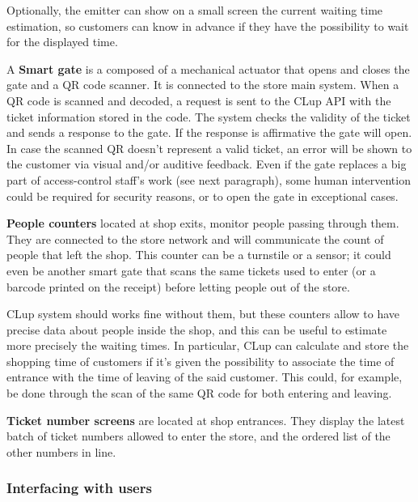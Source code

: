 Optionally, the emitter can show on a small screen the current waiting time estimation, so customers can know in advance if they have the possibility to wait for the displayed time.


A \textbf{Smart gate} is a composed of a mechanical actuator that opens and closes the gate and a QR code scanner. It is connected to the store main system. When a QR code is scanned and decoded, a request is sent to the CLup API with the ticket information stored in the code.
The system checks the validity of the ticket and sends a response to the gate. If the response is affirmative the gate will open. In case the scanned QR doesn't represent a valid ticket, an error will be shown to the customer via visual and/or auditive feedback. Even if the gate replaces a big part of access-control staff's work (see next paragraph), some human intervention could be required for security reasons, or to open the gate in exceptional cases.


\textbf{People counters} located at shop exits, monitor people passing through them. They are connected to the store network and will communicate the count of people that left the shop. This counter can be a turnstile or a sensor; it could even be another smart gate that scans the same tickets used to enter (or a barcode printed on the receipt) before letting people out of the store.

CLup system should works fine without them, but these counters allow to have precise data about people inside the shop, and this can be useful to estimate more precisely the waiting times. In particular, CLup can calculate and store the shopping time of customers if it's given the possibility to associate the time of entrance with the time of leaving of the said customer. This could, for example, be done through the scan of the same QR code for both entering and leaving.


\textbf{Ticket number screens} are located at shop entrances. They display the latest batch of ticket numbers allowed to enter the store, and the ordered list of the other numbers in line.

\vfill


\subsubsection{Interfacing with users}

